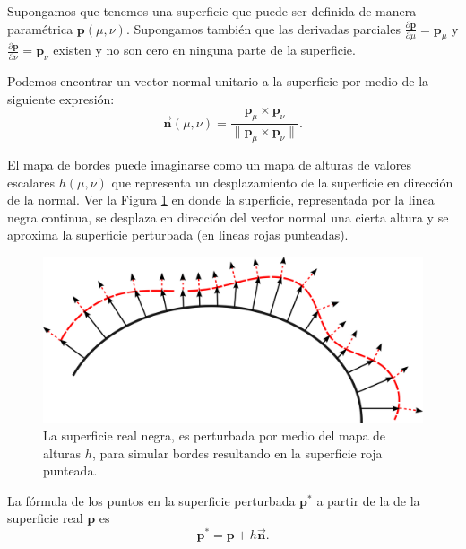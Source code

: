 Supongamos que tenemos una superficie que puede ser definida de manera paramétrica $\textbf{p}(\mu,\nu)$. Supongamos también que las derivadas parciales $\frac{\partial \textbf{p}}{\partial \mu} = \textbf{p}_\mu$ y $\frac{\partial \textbf{p}}{\partial \nu} = \textbf{p}_\nu$ existen y no son cero en ninguna parte de la superficie.

Podemos encontrar un vector normal unitario a la superficie por medio de la siguiente expresión:
\begin{equation}
\vec{\textbf{n}}(\mu,\nu) = \dfrac{\textbf{p}_\mu \times \textbf{p}_\nu}{\| \textbf{p}_\mu \times \textbf{p}_\nu \|}. 
\label{ec:normalSupParametrica}
\end{equation}

El mapa de bordes puede imaginarse como un mapa de alturas de valores escalares $h(\mu,\nu)$ que representa un desplazamiento de la superficie en dirección de la normal. Ver la Figura \ref{fig:bumpMapDiag} en donde la superficie, representada por la linea negra continua, se desplaza en dirección del vector normal una cierta altura y se aproxima la superficie perturbada (en lineas rojas punteadas).

\begin{figure}[htp]
 \centering
  \includegraphics[scale=0.5]{img/cap01/bumpMapDiag}
  \caption[Diagrama geométrico del mapeo de relieves]{La superficie real negra, es perturbada por medio del mapa de alturas $h$, para simular bordes resultando en la superficie roja punteada.}
  \label{fig:bumpMapDiag}
\end{figure}

La fórmula de los puntos en la superficie perturbada $\textbf{p}^{*}$ a partir de la de la superficie real $\textbf{p}$ es
\begin{equation}
\textbf{p}^{*} = \textbf{p} + h \vec{\textbf{n}}.
\label{ec:bumMapPerturbacion}
\end{equation}

